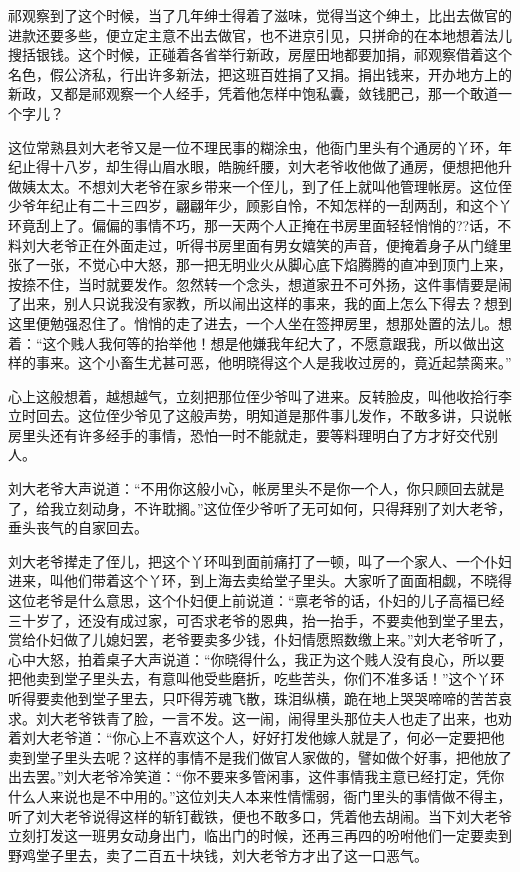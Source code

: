 \documentclass[12pt,UTF8]{ctexbook}
\begin{document}
{{{祁观察到了这个时候，当了几年绅士得着了滋味，觉得当这个绅土，比出去做官的进款还要多些，便立定主意不出去做官，也不进京引见，只拼命的在本地想着法儿搜括银钱。这个时候，正碰着各省举行新政，房屋田地都要加捐，祁观察借着这个名色，假公济私，行出许多新法，把这班百姓捐了又捐。捐出钱来，开办地方上的新政，又都是祁观察一个人经手，凭着他怎样中饱私囊，敛钱肥己，那一个敢道一个字儿？

这位常熟县刘大老爷又是一位不理民事的糊涂虫，他衙门里头有个通房的丫环，年纪止得十八岁，却生得山眉水眼，皓腕纤腰，刘大老爷收他做了通房，便想把他升做姨太太。不想刘大老爷在家乡带来一个侄儿，到了任上就叫他管理帐房。这位侄少爷年纪止有二十三四岁，翩翩年少，顾影自怜，不知怎样的一刮两刮，和这个丫环竟刮上了。偏偏的事情不巧，那一天两个人正掩在书房里面轻轻悄悄的??话，不料刘大老爷正在外面走过，听得书房里面有男女嬉笑的声音，便掩着身子从门缝里张了一张，不觉心中大怒，那一把无明业火从脚心底下焰腾腾的直冲到顶门上来，按捺不住，当时就要发作。忽然转一个念头，想道家丑不可外扬，这件事情要是闹了出来，别人只说我没有家教，所以闹出这样的事来，我的面上怎么下得去？想到这里便勉强忍住了。悄悄的走了进去，一个人坐在签押房里，想那处置的法儿。想着：“这个贱人我何等的抬举他！想是他嫌我年纪大了，不愿意跟我，所以做出这样的事来。这个小畜生尤甚可恶，他明晓得这个人是我收过房的，竟近起禁脔来。”

心上这般想着，越想越气，立刻把那位侄少爷叫了进来。反转脸皮，叫他收拾行李立时回去。这位侄少爷见了这般声势，明知道是那件事儿发作，不敢多讲，只说帐房里头还有许多经手的事情，恐怕一时不能就走，要等料理明白了方才好交代别人。

刘大老爷大声说道：“不用你这般小心，帐房里头不是你一个人，你只顾回去就是了，给我立刻动身，不许耽搁。”这位侄少爷听了无可如何，只得拜别了刘大老爷，垂头丧气的自家回去。

刘大老爷撵走了侄儿，把这个丫环叫到面前痛打了一顿，叫了一个家人、一个仆妇进来，叫他们带着这个丫环，到上海去卖给堂子里头。大家听了面面相觑，不晓得这位老爷是什么意思，这个仆妇便上前说道：“禀老爷的话，仆妇的儿子高福已经三十岁了，还没有成过家，可否求老爷的恩典，抬一抬手，不要卖他到堂子里去，赏给仆妇做了儿媳妇罢，老爷要卖多少钱，仆妇情愿照数缴上来。”刘大老爷听了，心中大怒，拍着桌子大声说道：“你晓得什么，我正为这个贱人没有良心，所以要把他卖到堂子里头去，有意叫他受些磨折，吃些苦头，你们不准多话！”这个丫环听得要卖他到堂子里去，只吓得芳魂飞散，珠泪纵横，跪在地上哭哭啼啼的苦苦哀求。刘大老爷铁青了脸，一言不发。这一闹，闹得里头那位夫人也走了出来，也劝着刘大老爷道：“你心上不喜欢这个人，好好打发他嫁人就是了，何必一定要把他卖到堂子里头去呢？这样的事情不是我们做官人家做的，譬如做个好事，把他放了出去罢。”刘大老爷冷笑道：“你不要来多管闲事，这件事情我主意已经打定，凭你什么人来说也是不中用的。”这位刘夫人本来性情懦弱，衙门里头的事情做不得主，听了刘大老爷说得这样的斩钉截铁，便也不敢多口，凭着他去胡闹。当下刘大老爷立刻打发这一班男女动身出门，临出门的时候，还再三再四的吩咐他们一定要卖到野鸡堂子里去，卖了二百五十块钱，刘大老爷方才出了这一口恶气。

}}}
\end{document}
